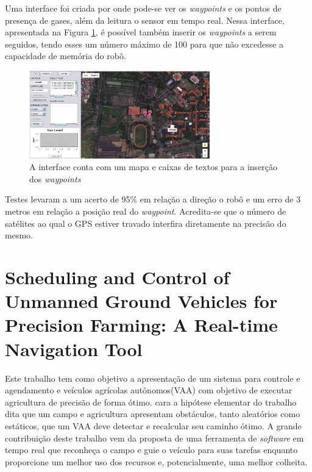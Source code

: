 Uma interface foi criada por \cite{Watiasih2017} onde pode-se ver os \textit{waypoints} e os pontos de presença de gases, além da leitura o sensor em tempo real. Nessa interface, apresentada na Figura \ref{fig:gas:interface}, é possível também inserir os \textit{waypoints} a serem seguidos, tendo esses um número máximo de 100 para que não excedesse a capacidade de memória do robô.
\begin{figure}[H]
    \centering
    \includegraphics[width=0.7\textwidth]{figuras/interface_robo_gas.png}
    \caption{A interface conta com um mapa e caixas de textos para a inserção dos \textit{waypoints}}
    \label{fig:gas:interface}
\end{figure}
Testes levaram a um acerto de 95\% em relação a direção o robô e um erro de 3 metros em relação a posição real do \textit{waypoint}. Acredita-se que o número de satélites ao qual o GPS estiver travado interfira diretamente na precisão do mesmo.
\section{Scheduling and Control of Unmanned Ground Vehicles for Precision Farming: A Real-time Navigation Tool}

Este trabalho tem como objetivo a apresentação de um sistema para controle e agendamento  e veículos agrícolas autônomos(VAA) com objetivo de executar agricultura de precisão de forma ótimo. \cite{vlachos:2017} cara a hipótese elementar do trabalho dita que um campo e agricultura apresentam obstáculos, tanto aleatórios como estáticos, que um VAA deve detectar e recalcular seu caminho ótimo.  A grande contribuição deste trabalho vem da proposta de uma ferramenta de  \textit{software} em tempo real que reconheça o campo e guie o veículo para suas tarefas enquanto proporcione um melhor uso dos recursos e, potencialmente, uma melhor colheita.

